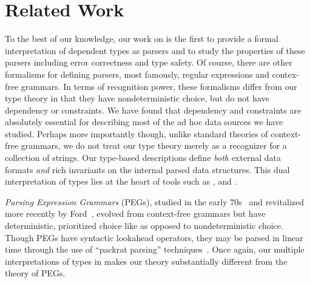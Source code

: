 \section{Related Work}
\label{sec:related}

To the best of our knowledge, our work on \ddc{} is the first to
provide a formal interpretation of dependent types as parsers and to
study the properties of these parsers including error correctness and
type safety. Of course, there are other formalisms for defining
parsers, most famously, regular expressions and contex-free grammars.
In terms of recognition power, these formalisms differ from our type
theory in that they have nondeterministic choice, but do not have
dependency or constraints.  We have found that dependency and
constraints are absolutely essential for describing most of the ad hoc
data sources we have studied.  Perhaps more importantly though, unlike
standard theories of context-free grammars, we do not treat our type
theory merely as a recognizer for a collection of strings.  Our
type-based descriptions define {\em both} external data formats {\em
  and} rich invariants on the internal parsed data structures.  This
dual interpretation of types lies at the heart of tools such as \pads,
\datascript{} and \packettypes{}.

{\em Parsing Expression Grammars} (PEGs), studied in the early
70s~\cite{birman+:parsing} and revitalized more recently by
Ford~\cite{ford:pegs}, evolved from context-free grammars but have
deterministic, prioritized choice like \ddc{} as opposed to
nondeterministic choice.  Though PEGs have syntactic lookahead
operators, they may be parsed in linear time through the use of
``packrat parsing'' techniques~\cite{ford:packrat,grimm:packrat}.
Once again, our multiple interpretations of types in \ddc{} makes our
theory substantially different from the theory of PEGs.


